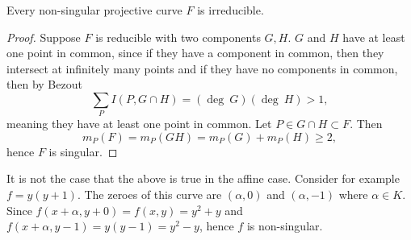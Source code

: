      \begin{proposition}
         Every non-singular projective curve $F$ is irreducible. 
     \end{proposition}
     \begin{proof}
         Suppose $F$ is reducible with two components $G,H$. $G$ and $H$ have at least one point in common, since if they have a component in common, then they intersect at infinitely many points and if they have no components in common, then by Bezout $$
            \sum_P I(P,G\cap H)=(\deg\ G) (\deg \ H)>1,
        $$ 
        meaning they have at least one point in common. Let $P\in G\cap H\subset F$. Then 
        $$
            m_P(F)=m_P(GH)=m_P(G)+m_P(H)\geq 2,
        $$ 
        hence $F$ is singular.
     \end{proof}
     \begin{remark}
         It is not the case that the above is true in the affine case. Consider for example $f=y(y+1)$. The zeroes of this curve are $(\alpha,0)$ and $(\alpha,-1)$ where $\alpha\in K$. Since $f(x+\alpha,y+0)=f(x,y)=y^2+y$ and $f(x+\alpha,y-1)=y(y-1)=y^2-y$, hence $f$ is non-singular.
     \end{remark}
